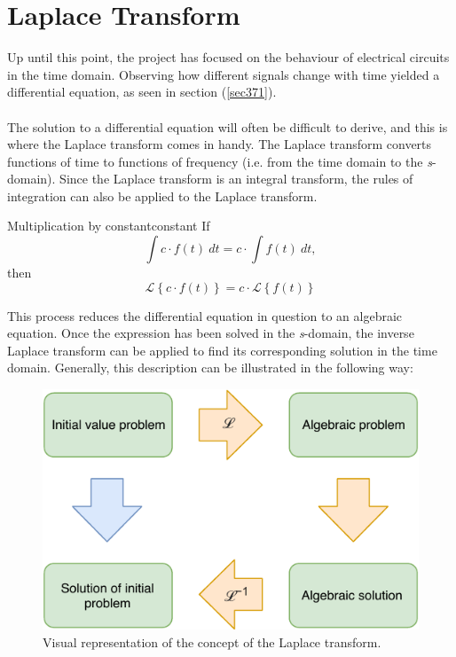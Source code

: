 \chapter{Laplace Transform}
Up until this point, the project has focused on the behaviour of electrical circuits in the time domain. Observing how different signals change with time yielded a differential equation, as seen in section (\ref{sec371}).
\\ \\
The solution to a differential equation will often be difficult to derive, and this is where the Laplace transform comes in handy. The Laplace transform converts functions of time to functions of frequency (i.e. from the time domain to the \textit{s}-domain). Since the Laplace transform is an integral transform, the rules of integration can also be applied to the Laplace transform.
\begin{definition}{Multiplication by constant}{constant}
If $$ \int c \cdot f(t) \ dt = c \cdot \int f(t) \ dt,$$
then $$\mathcal{L} \left\{c \cdot f(t) \right\} = c \cdot \mathcal{L} \left\{f(t) \right\}$$
\end{definition}
\noindent This process reduces the differential equation in question to an algebraic equation. Once the expression has been solved in the \textit{s}-domain, the inverse Laplace transform can be applied to find its corresponding solution in the time domain. Generally, this description can be illustrated in the following way:
\begin{figure}[H]
\center
\includegraphics[scale=1]{fig/img/laplace_circ.pdf}
\caption{Visual representation of the concept of the Laplace transform.}
\label{lpsol}
\end{figure}

